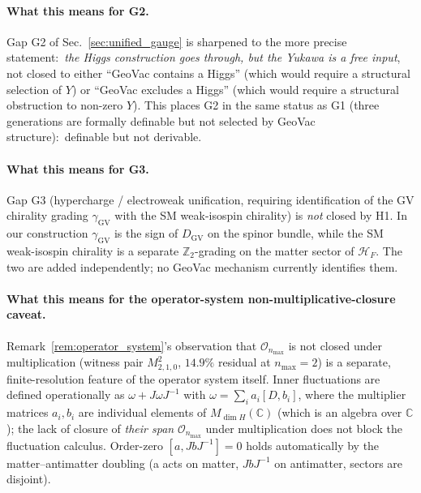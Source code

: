 \documentclass[11pt]{article}
\begin{document}
\paragraph{What this means for G2.}  Gap G2 of
Sec.~\ref{sec:unified_gauge} is sharpened to the more precise
statement:\ \emph{the Higgs construction goes through, but the
Yukawa is a free input}, not closed to either ``GeoVac contains a
Higgs'' (which would require a structural selection of $Y$) or
``GeoVac excludes a Higgs'' (which would require a structural
obstruction to non-zero $Y$).  This places G2 in the same status
as G1 (three generations are formally definable but not selected
by GeoVac structure):\ definable but not derivable.

\paragraph{What this means for G3.}  Gap G3 (hypercharge /
electroweak unification, requiring identification of the GV
chirality grading $\gamma_{\mathrm{GV}}$ with the SM weak-isospin
chirality) is \emph{not} closed by H1.  In our construction
$\gamma_{\mathrm{GV}}$ is the sign of $D_{\mathrm{GV}}$ on the
spinor bundle, while the SM weak-isospin chirality is a separate
$\mathbb{Z}_2$-grading on the matter sector of $\mathcal{H}_F$.
The two are added independently; no GeoVac mechanism currently
identifies them.

\paragraph{What this means for the operator-system non-multiplicative-closure
caveat.}  Remark~\ref{rem:operator_system}'s observation that
$\mathcal{O}_{n_{\max}}$ is not closed under multiplication
(witness pair $M_{2,1,0}^2$, $14.9\%$ residual at $n_{\max} = 2$)
is a separate, finite-resolution feature of the operator system
itself.  Inner fluctuations are defined operationally as $\omega +
J \omega J^{-1}$ with $\omega = \sum_i a_i [D, b_i]$, where the
multiplier matrices $a_i, b_i$ are individual elements of
$M_{\dim H}(\mathbb{C})$ (which is an algebra over $\mathbb{C}$);
the lack of closure of \emph{their span} $\mathcal{O}_{n_{\max}}$
under multiplication does not block the fluctuation calculus.
Order-zero $[a, J b J^{-1}] = 0$ holds automatically by the
matter--antimatter doubling (a acts on matter, $J b J^{-1}$ on
antimatter, sectors are disjoint).
\end{document}
